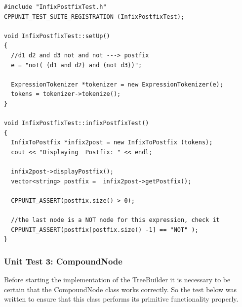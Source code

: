 \documentclass[10pt, a4paper, titlepage]{article}
\begin{document}
\small
\begin{lstlisting}
#include "InfixPostfixTest.h"
CPPUNIT_TEST_SUITE_REGISTRATION (InfixPostfixTest);

void InfixPostfixTest::setUp()
{
  //d1 d2 and d3 not and not ---> postfix
  e = "not( (d1 and d2) and (not d3))";
  
  ExpressionTokenizer *tokenizer = new ExpressionTokenizer(e);
  tokens = tokenizer->tokenize();
}

void InfixPostfixTest::infixPostfixTest()
{
  InfixToPostfix *infix2post = new InfixToPostfix (tokens);
  cout << "Displaying  Postfix: " << endl;
  
  infix2post->displayPostfix();
  vector<string> postfix =  infix2post->getPostfix();
  
  CPPUNIT_ASSERT(postfix.size() > 0);

  //the last node is a NOT node for this expression, check it
  CPPUNIT_ASSERT(postfix[postfix.size() -1] == "NOT" );
}
\end{lstlisting}
\large

\subsubsection{Unit Test 3: CompoundNode}
Before starting the implementation of the TreeBuilder it is necessary to be certain that the CompoundNode class works correctly. So the test below was written to ensure that this class performs its primitive functionality properly.
\end{document}
